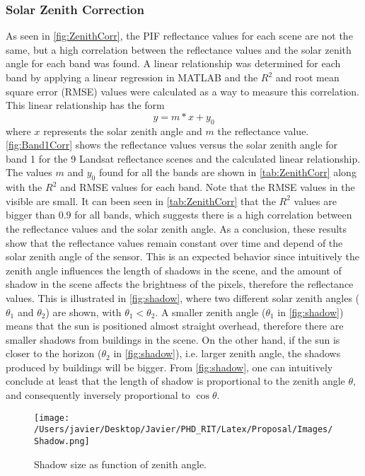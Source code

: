 \subsubsection{Solar Zenith Correction}

As seen in \autoref{fig:ZenithCorr}, the PIF reflectance values for each scene are not the same, but a high correlation between the reflectance values and the solar zenith angle for each band was found. A linear relationship was determined for each band by applying a linear regression in MATLAB and the $R^2$ and root mean square error (RMSE) values were calculated as a way to measure this correlation. This linear relationship has the form 
\begin{equation}
	y = m*x + y_0
	\label{eq:linear}
\end{equation}
where $x$ represents the solar zenith angle and $m$ the reflectance value. \autoref{fig:Band1Corr} shows the reflectance values versus the solar zenith angle for band 1 for the 9 Landsat reflectance scenes and the calculated linear relationship. The values $m$ and $y_0$ found for all the bands are shown in \autoref{tab:ZenithCorr} along with the $R^2$ and RMSE values for each band. Note that the RMSE values in the visible are small. It can been seen in \autoref{tab:ZenithCorr} that the $R^2$ values are bigger than $0.9$ for all bands, which suggests there is a high correlation between the reflectance values and the solar zenith angle. As a conclusion, these results show that the reflectance values remain constant over time and depend of the solar zenith angle of the sensor. This is an expected behavior since intuitively the zenith angle influences the length of shadows in the scene, and the amount of shadow in the scene affects the brightness of the pixels, therefore the reflectance values. This is illustrated in \autoref{fig:shadow}, where two different solar zenith angles ($\theta_1$ and $\theta_2$) are shown, with $\theta_1<\theta_2$. A smaller zenith angle ($\theta_1$ in \autoref{fig:shadow}) means that the sun is positioned almost straight overhead, therefore there are smaller shadows from buildings in the scene. On the other hand, if the sun is closer to the horizon ($\theta_2$ in \autoref{fig:shadow}), i.e. larger zenith angle, the shadows produced by buildings will be bigger. From \autoref{fig:shadow}, one can intuitively conclude at least that the length of shadow is proportional to the zenith angle $\theta$, and consequently inversely proportional to $\cos{\theta}$.

\begin{figure}[!ht]
    \centering
    \texttt{[image: /Users/javier/Desktop/Javier/PHD\_RIT/Latex/Proposal/Images/Shadow.png]}
  \caption{Shadow size as function of zenith angle. \label{fig:shadow} } 
\end{figure}

